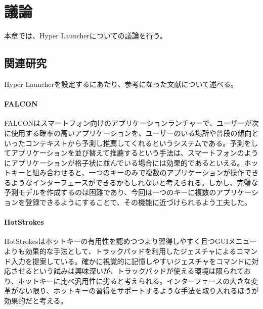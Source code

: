\chapter{議論}
本章では、Hyper Launcherについての議論を行う。

\newpage

\section{関連研究}
Hyper Launcherを設定するにあたり、参考になった文献について述べる。


\subsubsection{FALCON}
FALCON\cite{falcon}はスマートフォン向けのアプリケーションランチャーで、ユーザーが次に使用する確率の高いアプリケーションを、ユーザーのいる場所や普段の傾向といったコンテキストから予測し推薦してくれるというシステムである。予測をしてアプリケーションを並び替えて推薦するという手法は、スマートフォンのようにアプリケーションが格子状に並んでいる場合には効果的であるといえる。ホットキーと組み合わせると、一つのキーのみで複数のアプリケーションが操作できるようなインターフェースができるかもしれないと考えられる。しかし、完璧な予測モデルを作成するのは困難であり、今回は一つのキーに複数のアプリケーションを登録できるようにすることで、その機能に近づけられるよう工夫した。

\subsubsection{HotStrokes}
HotStrokes\cite{hotstrokes}はホットキーの有用性を認めつつより習得しやすく且つGUIメニューよりも効果的な手法として、トラックパッドを利用したジェスチャによるコマンド入力を提案している。確かに視覚的に記憶しやすいジェスチャをコマンドに対応させるという試みは興味深いが、トラックパッドが使える環境は限られており、ホットキーに比べ汎用性に劣ると考えられる。インターフェースの大きな変革がない限り、ホットキーの習得をサポートするような手法を取り入れるほうが効果的だと考える。


